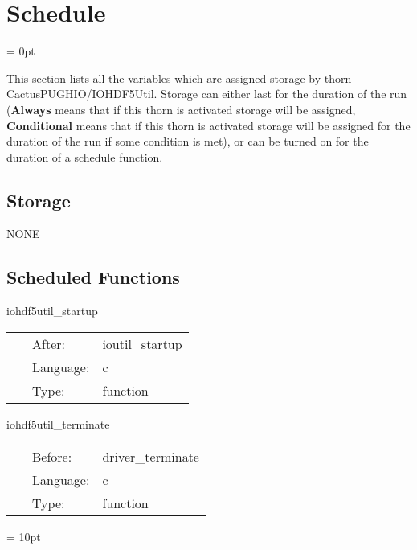 
\section{Schedule} 


\parskip = 0pt


\noindent This section lists all the variables which are assigned storage by thorn CactusPUGHIO/IOHDF5Util.  Storage can either last for the duration of the run ({\bf Always} means that if this thorn is activated storage will be assigned, {\bf Conditional} means that if this thorn is activated storage will be assigned for the duration of the run if some condition is met), or can be turned on for the duration of a schedule function.


\subsection*{Storage}NONE
\subsection*{Scheduled Functions}
\vspace{5mm}


\hspace{5mm} iohdf5util\_startup 

\hspace{5mm}{\it iohdf5util startup routine } 


\hspace{5mm}

 \begin{tabular*}{160mm}{cll} 
~ & After:  & ioutil\_startup \\ 
~ & Language:  & c \\ 
~ & Type:  & function \\ 
\end{tabular*} 


\vspace{5mm}


\hspace{5mm} iohdf5util\_terminate 

\hspace{5mm}{\it iohdf5util termination routine } 


\hspace{5mm}

 \begin{tabular*}{160mm}{cll} 
~ & Before:  & driver\_terminate \\ 
~ & Language:  & c \\ 
~ & Type:  & function \\ 
\end{tabular*} 



\vspace{5mm}\parskip = 10pt 
